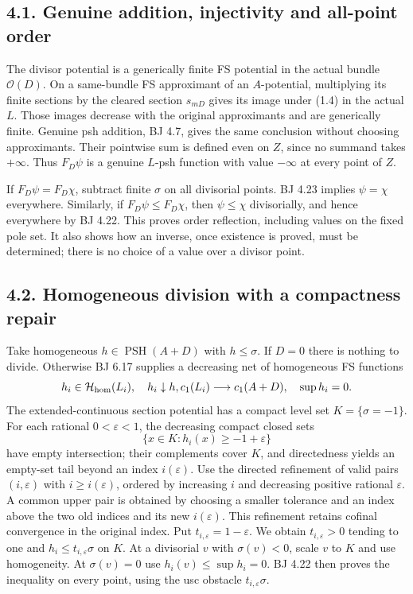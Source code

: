 \documentclass[
  10pt,
]{article}
\begin{document}
\subsection{4.1. Genuine addition, injectivity and all-point
order}\label{genuine-addition-injectivity-and-all-point-order}

The divisor potential is a generically finite FS potential in the actual
bundle \(\mathcal O(D)\). On a same-bundle FS approximant of an
\(A\)-potential, multiplying its finite sections by the cleared section
\(s_{mD}\) gives its image under (1.4) in the actual \(L\). Those images
decrease with the original approximants and are generically finite.
Genuine psh addition, BJ 4.7, gives the same conclusion without choosing
approximants. Their pointwise sum is defined even on \(Z\), since no
summand takes \(+\infty\). Thus \(F_D\psi\) is a genuine \(L\)-psh
function with value \(-\infty\) at every point of \(Z\).

If \(F_D\psi=F_D\chi\), subtract finite \(\sigma\) on all divisorial
points. BJ 4.23 implies \(\psi=\chi\) everywhere. Similarly, if
\(F_D\psi\leq F_D\chi\), then \(\psi\leq\chi\) divisorially, and hence
everywhere by BJ 4.22. This proves order reflection, including values on
the fixed pole set. It also shows how an inverse, once existence is
proved, must be determined; there is no choice of a value over a divisor
point.

\subsection{4.2. Homogeneous division with a compactness
repair}\label{homogeneous-division-with-a-compactness-repair}

Take homogeneous \(h\in\operatorname{PSH}(A+D)\) with \(h\leq\sigma\).
If \(D=0\) there is nothing to divide. Otherwise BJ 6.17 supplies a
decreasing net of homogeneous FS functions \[
 h_i\in\mathcal H_{\rm hom}(L_i),\quad h_i\downarrow h,
          c_1(L_i)\longrightarrow c_1(A+D),\quad \sup h_i=0.
\] The extended-continuous section potential has a compact level set
\(K=\{\sigma=-1\}\). For each rational \(0<\varepsilon<1\), the
decreasing compact closed sets \[\{x\in K:h_i(x)\geq-1+\varepsilon\}\]
have empty intersection; their complements cover \(K\), and directedness
yields an empty-set tail beyond an index \(i(\varepsilon)\). Use the
directed refinement of valid pairs \((i,\varepsilon)\) with
\(i\geq i(\varepsilon)\), ordered by increasing \(i\) and decreasing
positive rational \(\varepsilon\). A common upper pair is obtained by
choosing a smaller tolerance and an index above the two old indices and
its new \(i(\varepsilon)\). This refinement retains cofinal convergence
in the original index. Put \(t_{i,\varepsilon}=1-\varepsilon\). We
obtain \(t_{i,\varepsilon}>0\) tending to one and
\(h_i\leq t_{i,\varepsilon}\sigma\) on \(K\). At a divisorial \(v\) with
\(\sigma(v)<0\), scale \(v\) to \(K\) and use homogeneity. At
\(\sigma(v)=0\) use \(h_i(v)\leq\sup h_i=0\). BJ 4.22 then proves the
inequality on every point, using the usc obstacle
\(t_{i,\varepsilon}\sigma\).
\end{document}
